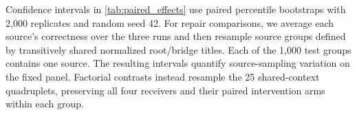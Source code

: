 Confidence intervals in \cref{tab:paired_effects} use paired percentile bootstraps with 2,000 replicates and random seed 42. For repair comparisons, we average each source's correctness over the three runs and then resample source groups defined by transitively shared normalized root/bridge titles. Each of the 1,000 test groups contains one source. The resulting intervals quantify source-sampling variation on the fixed panel. Factorial contrasts instead resample the 25 shared-context quadruplets, preserving all four receivers and their paired intervention arms within each group.

\begin{table}[!htbp]
  \centering
  \caption{Paired composed-accuracy changes in percentage points, with 95\% bootstrap intervals. Repair comparisons use source-wise run averages; bridge calibration uses its own experiment's native reference.}
  \label{tab:paired_effects}
  \small
  \setlength{\tabcolsep}{5pt}
  
\end{table}

\begin{table}[!htbp]
  \centering
  \caption{Composed accuracy (percent) on the same 1,000 test sources for each recorded run. Interpretation of run dispersion follows Appendix~\ref{app:uncertainty}.}
  \label{tab:per_run}
  \small
  \setlength{\tabcolsep}{6pt}
  
\end{table}
